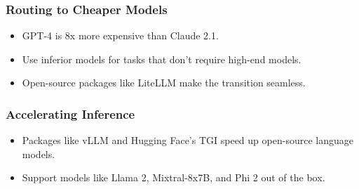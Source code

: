 \begin{frame}[fragile]\frametitle{Routing to Cheaper Models}
    \begin{itemize}
        \item GPT-4 is 8x more expensive than Claude 2.1.
        \item Use inferior models for tasks that don't require high-end models.
        \item Open-source packages like LiteLLM make the transition seamless.
    \end{itemize}
\end{frame}

\begin{frame}[fragile]\frametitle{Accelerating Inference}
    \begin{itemize}
        \item Packages like vLLM and Hugging Face's TGI speed up open-source language models.
        \item Support models like Llama 2, Mixtral-8x7B, and Phi 2 out of the box.
    \end{itemize}
\end{frame}